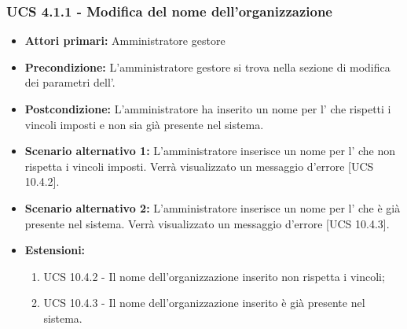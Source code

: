 \subsubsection{UCS 4.1.1 - Modifica del nome dell'organizzazione}%
\begin{itemize}
	\item \textbf{Attori primari:} Amministratore gestore
	\item \textbf{Precondizione:} L'amministratore gestore si trova nella sezione di modifica dei parametri dell'.
	\item \textbf{Postcondizione:} L'amministratore ha inserito un nome per l' che rispetti i vincoli imposti e non sia già presente nel sistema.
	\item \textbf{Scenario alternativo 1:} L'amministratore inserisce un nome per l' che non rispetta i vincoli imposti. Verrà visualizzato un messaggio d'errore [UCS 10.4.2].
	\item \textbf{Scenario alternativo 2:} L'amministratore inserisce un nome per l' che è già presente nel sistema. Verrà visualizzato un messaggio d'errore [UCS 10.4.3].
	\item \textbf{Estensioni:}
	\begin{enumerate}
		\item UCS 10.4.2 - Il nome dell'organizzazione inserito non rispetta i vincoli;
		\item UCS 10.4.3 - Il nome dell'organizzazione inserito è già presente nel sistema.
	\end{enumerate}
\end{itemize}

